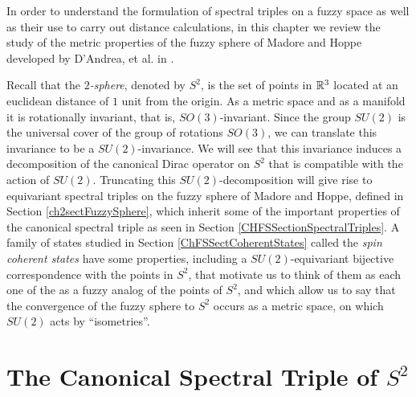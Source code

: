 In order to understand the formulation of spectral triples on a fuzzy space as well as their use to carry out distance calculations, in this chapter we review the study of the metric properties of the fuzzy sphere of Madore and Hoppe \cite{Madore} developed by D'Andrea, et al. in \cite{DAndrea2013}. 

Recall that the \emph{$2$-sphere}, denoted by $S^2$, is the set of points in $\mathbb{R}^3$ located at an euclidean distance of $1$ unit from the origin. As a metric space and as a manifold it is rotationally invariant, that is, $SO(3)$-invariant. Since the group $SU(2)$ is the universal cover of the group of rotations $SO(3)$, we can translate this invariance to be a $SU(2)$-invariance. We will see that this invariance induces a decomposition of the canonical Dirac operator on $S^2$ that is compatible with the action of $SU(2)$. Truncating this $SU(2)$-decomposition will give rise to equivariant spectral triples on the fuzzy sphere of Madore and Hoppe, defined in Section \ref{ch2sectFuzzySphere}, which inherit some of the important properties of the canonical spectral triple as seen in Section \ref{CHFSSectionSpectralTriples}. A family of states studied in Section \ref{ChFSSectCoherentStates} called the \textit{spin coherent states} have some properties, including a $SU(2)$-equivariant bijective correspondence with the points in $S^2$, that motivate us to think of them as each one of the as a fuzzy analog of the points of $S^2$, and which allow us to say that the convergence of the fuzzy sphere to $S^2$ occurs as a metric space, on which $SU(2)$ acts by ``isometries''.


\section{The Canonical Spectral Triple of $S^2$}





    
